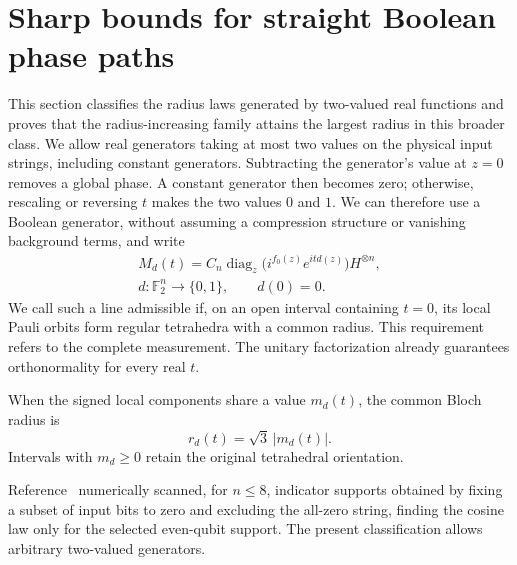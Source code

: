\section{Sharp bounds for straight Boolean phase paths}
\label{bound:section}

This section classifies the radius laws generated by two-valued real functions and proves that the radius-increasing family attains the largest radius in this broader class. We allow real generators taking at most two values on the physical input strings, including constant generators.
Subtracting the generator's value at $z=0$ removes a global phase.
A constant generator then becomes zero; otherwise, rescaling or reversing
$t$ makes the two values $0$ and $1$. We can therefore use a Boolean
generator, without assuming a compression structure or vanishing background terms, and write
\begin{equation}
 \begin{gathered}
 M_d(t)=C_n\operatorname{diag}_{z}
 \bigl(i^{f_0(z)}e^{itd(z)}\bigr)H^{\otimes n},\\
 d:\mathbb F_2^n\longrightarrow\{0,1\},\qquad d(0)=0.
 \end{gathered}
 \label{bound:line}
\end{equation}
We call such a line admissible if, on an open interval containing $t=0$,
its local Pauli orbits form regular tetrahedra with a common radius.
This requirement refers to the complete measurement.  The unitary
factorization already guarantees orthonormality for every real $t$.

When the signed local components share a value $m_d(t)$, the common
Bloch radius is
\begin{equation}
 r_d(t)=\sqrt3\,|m_d(t)|.
 \label{bound:radius}
\end{equation}
Intervals with $m_d\ge0$ retain the original tetrahedral orientation.

Reference~\cite{PauwelsGisin2026} numerically scanned, for $n\le8$, indicator supports obtained by fixing a subset of input bits to zero and excluding the all-zero string, finding the cosine law only for the selected even-qubit support. The present classification allows arbitrary two-valued generators.

